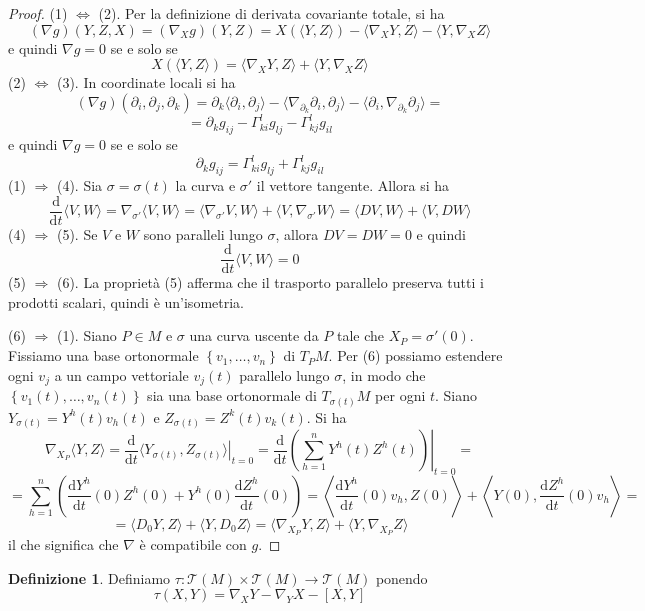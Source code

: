 \documentclass[a4paper,11pt]{article}
\theoremstyle{definition}
\newtheorem{definizione}{Definizione}[section]
\theoremstyle{theorem}
\newcommand{\dif}{\mathrm{d}}
\newcommand{\T}{\mathcal{T}}
\begin{document}
\begin{proof}
	(1) $\Leftrightarrow$ (2). Per la definizione di derivata covariante totale, si ha
	\[\left(\nabla g\right)(Y,Z,X)=\left(\nabla_X g\right)(Y,Z)=X\left(\langle Y,Z\rangle\right)-\langle\nabla_XY,Z\rangle-\langle Y,\nabla_XZ\rangle\]
	e quindi $\nabla g=0$ se e solo se
	\[X\left(\langle Y,Z\rangle\right)=\langle\nabla_XY,Z\rangle+\langle Y,\nabla_XZ\rangle\]
	(2) $\Leftrightarrow$ (3). In coordinate locali si ha
	\[\left(\nabla g\right)\left(\partial_i,\partial_j,\partial_k\right)=\partial_k\langle\partial_i,\partial_j\rangle-\langle\nabla_{\partial_k}\partial_i,\partial_j\rangle-\langle\partial_i,\nabla_{\partial_k}\partial_j\rangle=\]\[=\partial_kg_{ij}-\Gamma^l_{ki}g_{lj}-\Gamma^l_{kj}g_{il}\]
	e quindi $\nabla g=0$ se e solo se
	\[\partial_kg_{ij}=\Gamma^l_{ki}g_{lj}+\Gamma^l_{kj}g_{il}\]
	(1) $\Rightarrow$ (4). Sia $\sigma=\sigma(t)$ la curva e $\sigma'$ il vettore tangente. Allora si ha
	\[\frac{\dif}{\dif t}\langle V,W\rangle=\nabla_{\sigma'}\langle V,W\rangle=\langle\nabla_{\sigma'}V,W\rangle+\langle V,\nabla_{\sigma'}W\rangle=\langle DV,W\rangle+\langle V,DW\rangle\]
	(4) $\Rightarrow$ (5). Se $V$ e $W$ sono paralleli lungo $\sigma$, allora $DV=DW=0$ e quindi
	\[\frac{\dif}{\dif t}\langle V,W\rangle=0\]
	(5) $\Rightarrow$ (6). La proprietà (5) afferma che il trasporto parallelo preserva tutti i prodotti scalari, quindi è un'isometria.
	
	\noindent (6) $\Rightarrow$ (1). Siano $P\in M$ e $\sigma$ una curva uscente da $P$ tale che $X_P=\sigma'(0)$. Fissiamo una base ortonormale $\left\{v_1,\dots,v_n\right\}$ di $T_PM$. Per (6) possiamo estendere ogni $v_j$ a un campo vettoriale $v_j(t)$ parallelo lungo $\sigma$, in modo che $\left\{v_1(t),\dots,v_n(t)\right\}$ sia una base ortonormale di $T_{\sigma(t)}M$ per ogni $t$. Siano $Y_{\sigma(t)}=Y^h(t)v_h(t)$ e $Z_{\sigma(t)}=Z^k(t)v_k(t)$. Si ha
	\[\nabla_{X_P}\langle Y,Z\rangle=\frac{\dif}{\dif t}\left.\langle Y_{\sigma(t)},Z_{\sigma(t)}\rangle\right|_{t=0}=\frac{\dif}{\dif t}\left.\left(\sum_{h=1}^{n}Y^h(t)Z^h(t)\right)\right|_{t=0}=\]\[=\sum_{h=1}^{n}\left(\frac{\dif Y^h}{\dif t}(0)Z^h(0)+Y^h(0)\frac{\dif Z^h}{\dif t}(0)\right)=\left\langle\frac{\dif Y^h}{\dif t}(0)v_h,Z(0)\right\rangle+\left\langle Y(0),\frac{\dif Z^h}{\dif t}(0)v_h\right\rangle=\]\[=\langle D_0Y,Z\rangle+\langle Y,D_0Z\rangle=\langle\nabla_{X_P}Y,Z\rangle+\langle Y,\nabla_{X_P}Z\rangle\]
	il che significa che $\nabla$ è compatibile con $g$.
\end{proof}
\begin{definizione}
	Definiamo $\tau\colon\T(M)\times\T(M)\to\T(M)$ ponendo
	\[\tau(X,Y)=\nabla_XY-\nabla_YX-[X,Y]\]
\end{definizione}
\end{document}
